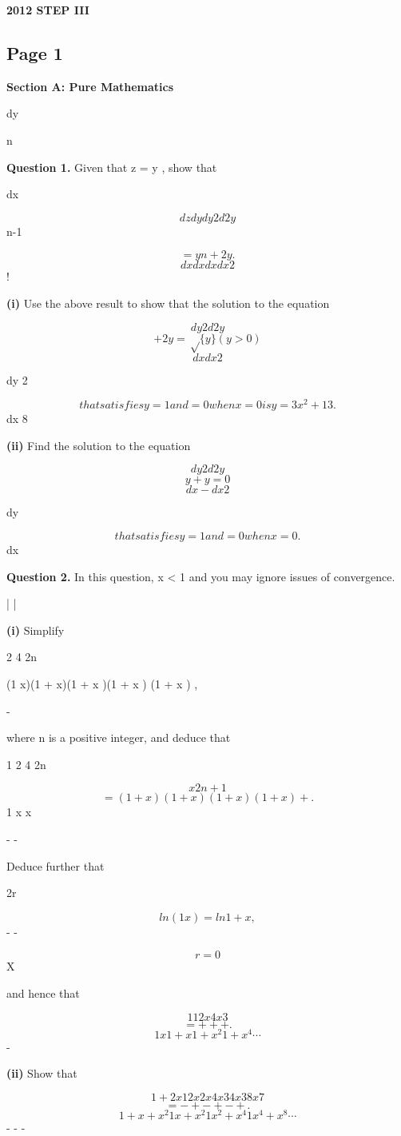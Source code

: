 \documentclass[12pt]{article}
\begin{document}
\begin{center}
{\Large \textbf{2012 STEP III}}
\end{center}

\subsection*{Page 1}
\begin{flushleft}
\bigskip\textbf{Section A: Pure Mathematics}\par
dy\par
n\par
\bigskip\textbf{Question 1.} Given that z = y , show that\par
dx\par
\lambda \mu\par
\[dz dy dy 2 d2y\]
n-1\par
\[= y n + 2y .\]
\[dx dx dx dx2\]
!\par
\lambda \mu\par
\textbf{(i)} Use the above result to show that the solution to the equation\par
\[dy 2 d2y\]
\[+ 2y = \sqrt\{y\} (y > 0)\]
\[dx dx2\]
\lambda \mu\par
dy 2\par
\[that satisfies y = 1 and = 0 when x = 0 is y = 3 x^2 + 1 3 .\]
dx 8\par
\textbf{(ii)} Find the solution to the equation\par
\[dy 2 d2y\]
\[y + y = 0\]
\[dx - dx2\]
\lambda \mu\par
dy\par
\[that satisfies y = 1 and = 0 when x = 0.\]
dx\par
\bigskip\textbf{Question 2.} In this question, x < 1 and you may ignore issues of convergence.\par
| |\par
\textbf{(i)} Simplify\par
2 4 2n\par
(1 x)(1 + x)(1 + x )(1 + x ) (1 + x ) ,\par
- \cdots\par
where n is a positive integer, and deduce that\par
1 2 4 2n\par
\[x2n+1\]
\[= (1 + x)(1 + x )(1 + x ) (1 + x ) + .\]
1 x  x\par
- -\par
Deduce further that\par
\infty\par
2r\par
\[ln(1 x) = ln 1 + x ,\]
- -\par
\[r=0\]
X\par
and hence that\par
\[1 1 2x 4x3\]
\[= + + + .\]
\[1 x 1 + x 1 + x^2 1 + x^4 \cdots\]
-\par
\textbf{(ii)} Show that\par
\[1 + 2x 1 2x 2x 4x3 4x3 8x7\]
\[= - + - + - + .\]
\[1 + x + x^2 1 x + x^2 1 x^2 + x^4 1 x^4 + x^8 \cdots\]
- - -\par
\end{flushleft}
\end{document}
